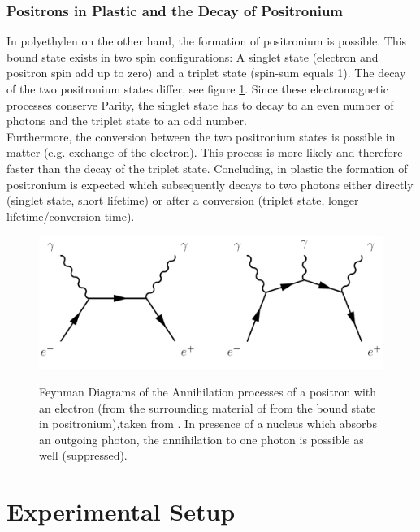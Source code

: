 \documentclass[
	paper=A4,
	parskip=full,
	chapterprefix=true,
	11pt,
	headings=normal,
	bibliography=totoc,
	listof=totoc,
	titlepage=on,
]{scrreprt}
\begin{document}
\subsection{Positrons in Plastic and the Decay of Positronium}

In polyethylen on the other hand, the formation of positronium is possible. This bound state exists in two spin configurations: A singlet state (electron and positron spin add up to zero) and a triplet state (spin-sum equals 1). The decay of the two positronium states differ, see figure \ref{fig:feynman_positronium}. Since these electromagnetic processes conserve Parity, the singlet state has to decay to an even number of photons and the triplet state to an odd number\cite{Lab_manual_T8}. \\
Furthermore, the conversion between the two positronium states is possible in matter (e.g. exchange of the electron). This process is more likely and therefore faster than the decay of the triplet state. Concluding, in plastic the formation of positronium is expected which subsequently decays to two photons either directly (singlet state, short lifetime)  or after a conversion (triplet state, longer lifetime/conversion time).

\begin{figure}
	\centering
	\includegraphics{feynman_positroniumdecay} \\
	\caption{Feynman Diagrams of the Annihilation processes of a positron with an electron (from the surrounding material of from the bound state in positronium),taken from \cite{Lab_manual_T8}. In presence of a nucleus which absorbs an outgoing photon, the annihilation to one photon is possible as well (suppressed).}
	\label{fig:feynman_positronium}
\end{figure}


\chapter{Experimental Setup}
\end{document}

